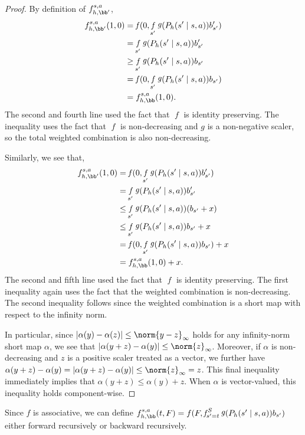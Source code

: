 \documentclass[pdftex, a4paper, 12pt]{article}
\DeclareMathOperator*{\f}{\mathit{f}}
\DeclareMathOperator*{\g}{\mathit{g}}
\begin{document}
\begin{proof}
    By definition of $f_{h, \bb'}^{s,a}$,
    \begin{align*}
        f_{h, \bb'}^{s,a}(1,0) &= \f(0, \f_{s'} \g(P_h(s' \mid s,a))b'_{s'}) \\
        &= \f_{s'} \g(P_h(s' \mid s,a))b'_{s'} \\
        &\geq \f_{s'} \g(P_h(s' \mid s,a))b_{s'} \\
        &= \f(0, \f_{s'} \g(P_h(s' \mid s,a))b_{s'}) \\
        &= f_{h, \bb}^{s,a}(1,0).
    \end{align*}
    The second and fourth line used the fact that $\f$ is identity preserving. The inequality uses the fact that $\f$ is non-decreasing and $g$ is a non-negative scaler, so the total weighted combination is also non-decreasing. 

    Similarly, we see that,
    \begin{align*}
        f_{h, \bb'}^{s,a}(1,0) &= \f(0, \f_{s'} \g(P_h(s' \mid s,a))b'_{s'}) \\
        &= \f_{s'} \g(P_h(s' \mid s,a))b'_{s'} \\
        &\leq \f_{s'} \g(P_h(s' \mid s,a))(b_{s'} + x) \\
        &\leq \f_{s'} \g(P_h(s' \mid s,a))b_{s'} + x \\
        &= \f(0, \f_{s'} \g(P_h(s' \mid s,a))b_{s'}) + x \\
        &= f_{h, \bb}^{s,a}(1,0) + x.
    \end{align*}
    The second and fifth line used the fact that $\f$ is identity preserving. The first inequality again uses the fact that the weighted combination is non-decreasing. The second inequality follows since the weighted combination is a short map with respect to the infinity norm. 
    
    In particular, since $|\alpha(y) - \alpha(z)| \leq \norm{y - z}_{\infty}$ holds for any infinity-norm short map $\alpha$, we see that $|\alpha(y+z) - \alpha(y)| \leq \norm{z}_{\infty}$. Moreover, if $\alpha$ is non-decreasing and $z$ is a positive scaler treated as a vector, we further have $\alpha(y+z) - \alpha(y) = |\alpha(y+z) - \alpha(y)| \leq \norm{z}_{\infty} = z$. This final inequality immediately implies that $\alpha(y+z) \leq \alpha(y) + z$. When $\alpha$ is vector-valued, this inequality holds component-wise.
\end{proof}

Since $f$ is associative, we can define $f_{h,\bb}^{s,a}(t,F) = f(F,\f_{s' = t}^S \g(P_h(s' \mid s,a))b_{s'})$ either forward recursively or backward recursively.
\end{document}
